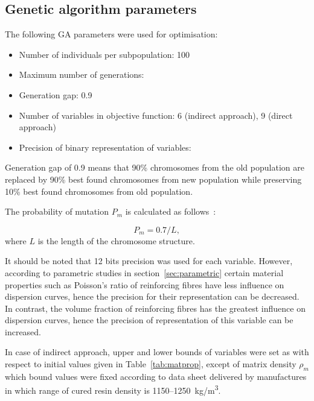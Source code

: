 	
\subsection{Genetic algorithm parameters}
		The following GA parameters were used for optimisation:
	\begin{itemize}
		\item Number of individuals per subpopulation: 100
		\item Maximum number of generations:  
		\item Generation gap: 0.9
		\item Number of variables in objective function: 6 (indirect approach), 9 (direct approach)
		\item Precision of binary representation of variables:  
   \end{itemize}
    Generation gap of 0.9 means that 90\% chromosomes from the old population are replaced by 90\% best found chromosomes from new population while preserving 10\% best found chromosomes from old population.
    
    The probability of mutation \(P_m\) is calculated as follows~\cite{Chipperfield1994}:
    
\begin{equation}
    	P_m = 0.7/L,
    \end{equation}
    where \(L\) is the length of the chromosome structure.
    
    It should be noted that 12 bits precision was used for each variable. However, according to parametric studies in section~\ref{sec:parametric} certain material properties such as Poisson's ratio of reinforcing fibres have less influence on dispersion curves, hence the precision for their representation can be decreased. In contrast, the volume fraction of reinforcing fibres has the greatest influence on dispersion curves, hence the precision of representation of this variable can be increased.
  
	In case of indirect approach, upper and lower bounds of variables were set as 
	 with respect to initial values given in Table~\ref{tab:matprop}, except of 
	matrix density \(\rho_m\) which bound values were fixed according to data sheet 
	delivered by manufactures in which range of cured resin density is 
	1150--1250~kg/m\textsuperscript{3}.  
	
